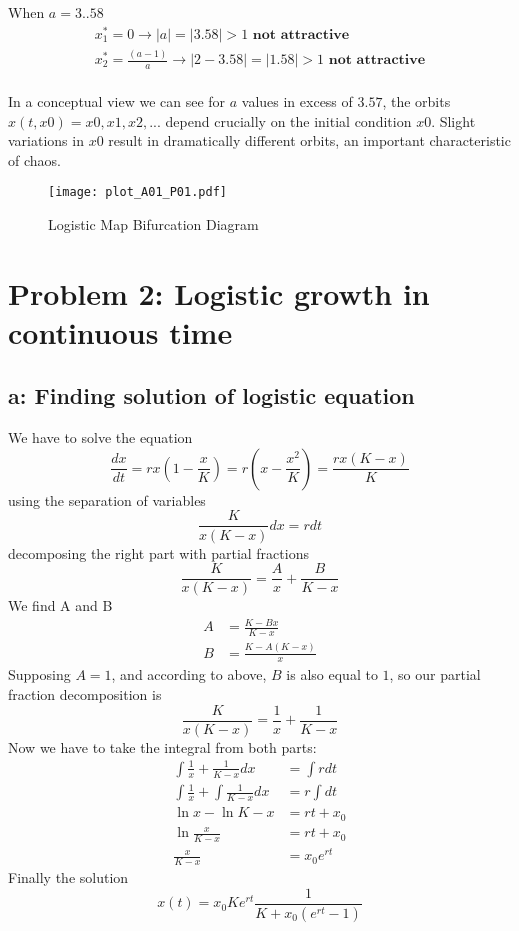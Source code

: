 When \textbf{$a = 3..58$} 
\begin{eqnarray}
x^*_1 = 0 \rightarrow |a| = |3.58| > 1 \textbf{ not attractive}\\
x^*_2 = \frac{(a-1)}{a}  \rightarrow |2-3.58|  = |1.58| > 1 \textbf{ not attractive}\\
\end{eqnarray}

In a conceptual view we can see for $a$ values in excess of $3.57$, the orbits $x(t, x0) = {x0, x1, x2, ... }$ depend crucially on the initial condition $x0$. Slight variations in $x0$ result in dramatically different orbits, an important characteristic of chaos.

\begin{figure}[h]
 \centering
    \texttt{[image: plot\_A01\_P01.pdf]}
    \caption{Logistic Map Bifurcation Diagram}
	\label{fig:plot_logistic_map_bifgraph}
\end{figure}


\setcounter{chapter}{2}
\setcounter{section}{0}
\section{Problem 2: Logistic growth in continuous time}
\subsection{a: Finding solution of logistic equation}
We have to solve the equation
\begin{equation}
\frac{dx}{dt} = rx (1-\frac{x}{K})  = r(x - \frac{x^2}{K}) = \frac{rx(K-x)}{K}
\label{eq:p02_main}
\end{equation}
using the separation of variables
\begin{equation}
\frac{K}{x(K-x)}dx = rdt
\end{equation}
decomposing the right part with partial fractions
\begin{equation}
\frac{K}{x(K-x)}=\frac{A}{x} + \frac{B}{K-x}
\end{equation}
We find A and B
\begin{align}
A&= \frac{K - Bx}{K-x} \\
B &= \frac{K-A(K-x)}{x}
\end{align}
Supposing $A = 1$, and according to above, $B$ is also equal to $1$, so our partial fraction decomposition is
\begin{equation}
\frac{K}{x(K-x)}=\frac{1}{x} + \frac{1}{K-x}
\end{equation}
Now we have to take the integral from both parts:
\begin{align}
\int{\frac{1}{x}+\frac{1}{K-x}dx} &= \int{rdt}\\
\int{\frac{1}{x}}+\int{\frac{1}{K-x}dx} &= r\int{dt}\\
\ln{x} - \ln{K-x} &= rt + x_0\\
\ln{\frac{x}{K-x}} &= rt + x_0\\
\frac{x}{K-x} &= x_0e^{rt}
\end{align}
Finally the solution 
\begin{equation}
x(t) = x_0Ke^{rt}\frac{1}{K + x_0(e^{rt}-1)}
\end{equation}


